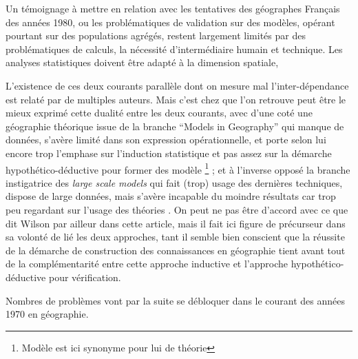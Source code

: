 {Un témoignage à mettre en relation avec les tentatives des géographes Français des années 1980, ou les problématiques de validation sur des modèles, opérant pourtant sur des populations agrégés, restent largement limités par des problématiques de calculs, la nécessité d'intermédiaire humain et technique. Les analyses statistiques doivent être adapté à la dimension spatiale, %


L'existence de ces deux courants parallèle dont on mesure mal l'inter-dépendance est relaté par de multiples auteurs. Mais c'est chez \autocite{Wilson1972} que l'on retrouve peut être le mieux exprimé cette dualité entre les deux courants, avec d'une coté une géographie théorique issue de la branche \foreignquote{english}{Models in Geography} qui manque de données, s'avère limité dans son expression opérationnelle, et porte selon lui encore trop l'emphase sur l'induction statistique et pas assez sur la démarche hypothético-déductive pour former des modèle \footnote{Modèle est ici synonyme pour lui de théorie} ; et à l'inverse opposé la branche instigatrice des \textit{large scale models} qui fait (trop) usage des dernières techniques, dispose de large données, mais s'avère incapable du moindre résultats car trop peu regardant sur l'usage des théories \autocite[10]{Batty1994}. On peut ne pas être d'accord avec ce que dit Wilson par ailleur dans cette article, mais il fait ici figure de précurseur dans sa volonté de lié les deux approches, tant il semble bien conscient que la réussite de la démarche de construction des connaissances en géographie tient avant tout de la complémentarité entre cette approche inductive et l'approche hypothético-déductive pour vérification.



Nombres de problèmes vont par la suite se débloquer dans le courant des années 1970 en géographie.


}
